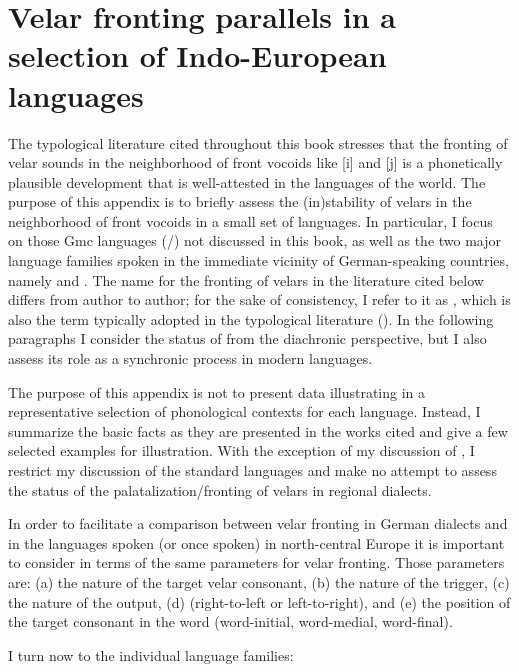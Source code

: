 \chapter{Velar fronting parallels in a selection of Indo-European languages}\label{appendix:i}

The typological literature cited throughout this book stresses that the fronting of velar sounds in the neighborhood of front vocoids like [i] and [j] is a phonetically plausible development that is well-attested in the languages of the world. The purpose of this appendix is to briefly assess the (in)stability of velars in the neighborhood of front vocoids in a small set of  languages. In particular, I focus on those Gmc languages (/) not discussed in this book, as well as the two major language families spoken in the immediate vicinity of German-speaking countries, namely  and . The name for the fronting of velars in the literature cited below differs from author to author; for the sake of consistency, I refer to it as , which is also the term typically adopted in the typological literature (). In the following paragraphs I consider the status of  from the diachronic perspective, but I also assess its role as a synchronic process in modern languages.

The purpose of this appendix is not to present data illustrating  in a representative selection of phonological contexts for each language. Instead, I summarize the basic facts as they are presented in the works cited and give a few selected examples for illustration. With the exception of my discussion of , I restrict my discussion of the standard languages and make no attempt to assess the status of the palatalization/fronting of velars in regional dialects.

In order to facilitate a comparison between velar fronting in German dialects and  in the languages spoken (or once spoken) in north-cen\-tral Europe it is important to consider  in terms of the same parameters for velar fronting. Those parameters are: (a) the nature of the target velar consonant, (b) the nature of the trigger, (c) the nature of the output, (d)  (right-to-left or left-to-right), and (e) the position of the target consonant in the word (word-initial, word-medial, word-final).

I turn now to the individual language families:

